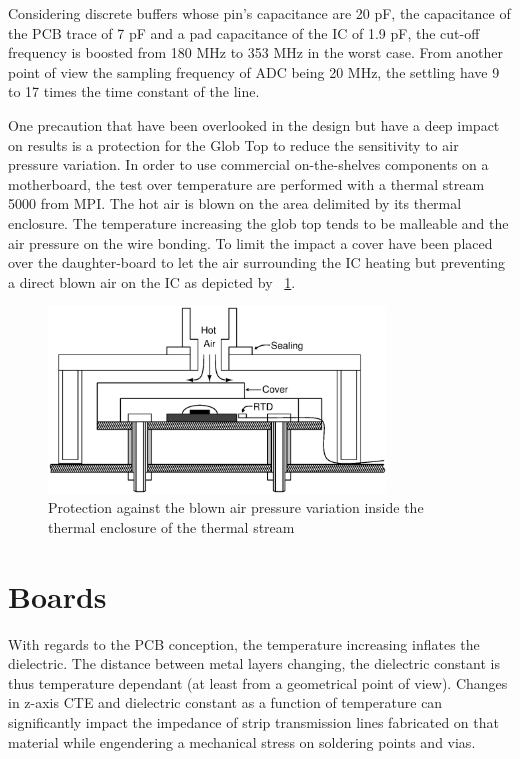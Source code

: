 Considering discrete buffers whose pin's capacitance are 20 pF, the capacitance of the PCB trace of 7 pF and a pad capacitance of the IC of 1.9 pF, the cut-off frequency is boosted from 180 MHz to 353 MHz in the worst case. From another point of view the sampling frequency of ADC being 20 MHz, the settling have 9 to 17 times the time constant of the line.

One precaution that have been overlooked in the design but have a deep impact on results is a protection for the Glob Top to reduce the sensitivity to air pressure variation. In order to use commercial on-the-shelves components on a motherboard, the test over temperature are performed with a thermal stream 5000 from MPI\@. The hot air is blown on the area delimited by its thermal enclosure. The temperature increasing the glob top tends to be malleable and the air pressure on the wire bonding. To limit the impact a cover have been placed over the daughter-board to let the air surrounding the IC heating but preventing a direct blown air on the IC as depicted by \figurename~\ref{fig:thermalstream-air-protection}.

\begin{figure}[htp]
    \centering
    \includegraphics[width=0.8\textwidth]{Chapter5/Figs/PCB/thermal-stream-protection.ps}
    \caption{Protection against the blown air pressure variation inside the thermal enclosure of the thermal stream}
    \label{fig:thermalstream-air-protection}
\end{figure}

\section{Boards}
With regards to the PCB conception, the temperature increasing inflates the dielectric. The distance between metal layers changing, the dielectric constant is thus temperature dependant (at least from a geometrical point of view). Changes in z-axis CTE and dielectric constant as a function of temperature can significantly impact the impedance of strip transmission lines fabricated on that material while engendering a mechanical stress on soldering points and vias.


